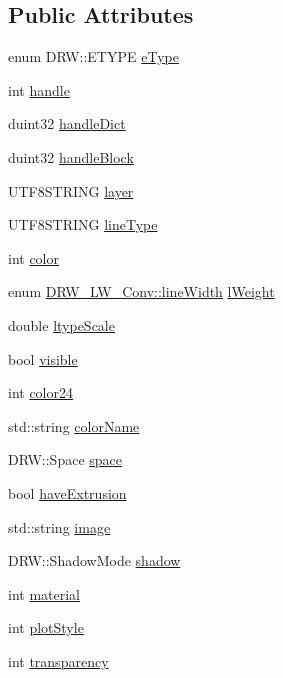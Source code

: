 \subsection*{Public Attributes}
\begin{DoxyCompactItemize}
\item 
enum D\+R\+W\+::\+E\+T\+Y\+P\+E \hyperlink{class_d_r_w___entity_a36dff42707384984a085dbea602d0217}{e\+Type}
\item 
int \hyperlink{class_d_r_w___entity_a32f66a2b4da26f1f9a42ffa8539c916c}{handle}
\item 
duint32 \hyperlink{class_d_r_w___entity_a76823e459149440d84397803e205dd55}{handle\+Dict}
\item 
duint32 \hyperlink{class_d_r_w___entity_afb7d80168b82c574d5387c4b0aa4cdd5}{handle\+Block}
\item 
U\+T\+F8\+S\+T\+R\+I\+N\+G \hyperlink{class_d_r_w___entity_a65b68c6c8712de3e2fada1d263b96042}{layer}
\item 
U\+T\+F8\+S\+T\+R\+I\+N\+G \hyperlink{class_d_r_w___entity_a1180883df434a22fdafbc8ac1273e46e}{line\+Type}
\item 
int \hyperlink{class_d_r_w___entity_a199afc08d2cc4c44ea58d49780582526}{color}
\item 
enum \hyperlink{class_d_r_w___l_w___conv_aed68cbc3d8bdf7e20003dd2d970279b3}{D\+R\+W\+\_\+\+L\+W\+\_\+\+Conv\+::line\+Width} \hyperlink{class_d_r_w___entity_a5e01429ed3b7199b17367a5c85970a0d}{l\+Weight}
\item 
double \hyperlink{class_d_r_w___entity_a167d107e81c5b2bb4ee015fa62e2fde2}{ltype\+Scale}
\item 
bool \hyperlink{class_d_r_w___entity_a410a134f3127298598a0075e60f3616d}{visible}
\item 
int \hyperlink{class_d_r_w___entity_a4448fbdbe618f83ed71a7c1ed98caeae}{color24}
\item 
std\+::string \hyperlink{class_d_r_w___entity_a84620ae9c9eea40d9d6373f28db5877a}{color\+Name}
\item 
D\+R\+W\+::\+Space \hyperlink{class_d_r_w___entity_a8baf5455459e70a668e59fd13cfa72e2}{space}
\item 
bool \hyperlink{class_d_r_w___entity_a62545716d4aec61cabb85576afc78dee}{have\+Extrusion}
\item 
std\+::string \hyperlink{class_d_r_w___entity_a10185df2d2f4d551921332c0968652d4}{image}
\item 
D\+R\+W\+::\+Shadow\+Mode \hyperlink{class_d_r_w___entity_add69fd0a0f9ac49dfc5aca84c3023c56}{shadow}
\item 
int \hyperlink{class_d_r_w___entity_a29c774531a5109cedc01eed7f2822f76}{material}
\item 
int \hyperlink{class_d_r_w___entity_abebf612b67fe860b34163f8cc16f0e78}{plot\+Style}
\item 
int \hyperlink{class_d_r_w___entity_a3706fb94037a61f8a4b705210b136117}{transparency}
\end{DoxyCompactItemize}
